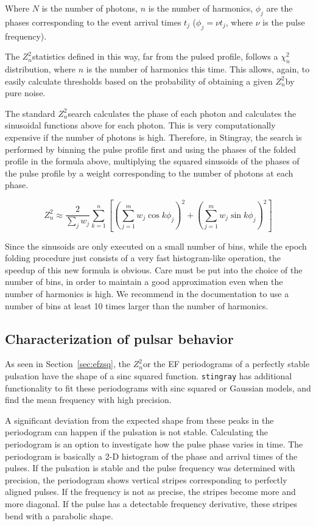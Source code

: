 \documentclass[12pt]{emulateapj}
\newcommand{\zsq}{\ensuremath{Z^2_n}}
\newcommand{\stingray}{\texttt{stingray}\xspace}
\begin{document}
Where $N$ is the number of photons, $n$ is the number of harmonics, $\phi_j$ are the phases corresponding to the event arrival times $t_j$ ($\phi_j = \nu t_j$, where $\nu$ is the pulse frequency).

The \zsq statistics defined in this way, far from the pulsed profile, follows a $\chi^2_n$ distribution, where $n$ is the number of harmonics this time.
This allows, again, to easily calculate thresholds based on the probability of obtaining a given \zsq by pure noise.

The standard \zsq search calculates the phase of each photon and calculates the sinusoidal functions above for each photon.
This is very computationally expensive if the number of photons is high. 
Therefore, in Stingray, the search is performed by binning the pulse profile first and using the phases of the folded profile in the formula above, multiplying the squared sinusoids of the phases of the pulse profile by a weight corresponding to the number of photons at each phase.

\begin{equation}
\zsq \approx \dfrac{2}{\sum_j{w_j}} \sum_{k=1}^n \left[{\left(\sum_{j=1}^m w_j \cos k \phi_j\right)}^2 + {\left(\sum_{j=1}^m w_j \sin k \phi_j\right)}^2\right]
\end{equation}

Since the sinusoids are only executed on a small number of bins, while the epoch folding procedure just consists of a very fast histogram-like operation, the speedup of this new formula is obvious. 
Care must be put into the choice of the number of bins, in order to maintain a good approximation even when the number of harmonics is high. 
We recommend in the documentation to use a number of bins at least 10 times larger than the number of harmonics.

\subsection{Characterization of pulsar behavior}
\label{sec:ephem}
As seen in Section~\ref{sec:efzsq}, the \zsq or the EF periodograms of a perfectly stable pulsation have the shape of a sinc squared function.
\stingray has additional functionality to fit these periodograms with sinc squared or Gaussian models, and find the mean frequency with high precision.

A significant deviation from the expected shape from these peaks in the periodogram can happen if the pulsation is not stable.
Calculating the periodogram is an option to investigate how the pulse phase varies in time.
The periodogram is basically a 2-D histogram of the phase and arrival times of the pulses. 
If the pulsation is stable and the pulse frequency was determined with precision, the periodogram shows vertical stripes corresponding to perfectly aligned pulses.
If the frequency is not as precise, the stripes become more and more diagonal.
If the pulse has a detectable frequency derivative, these stripes bend with a parabolic shape.
\end{document}

